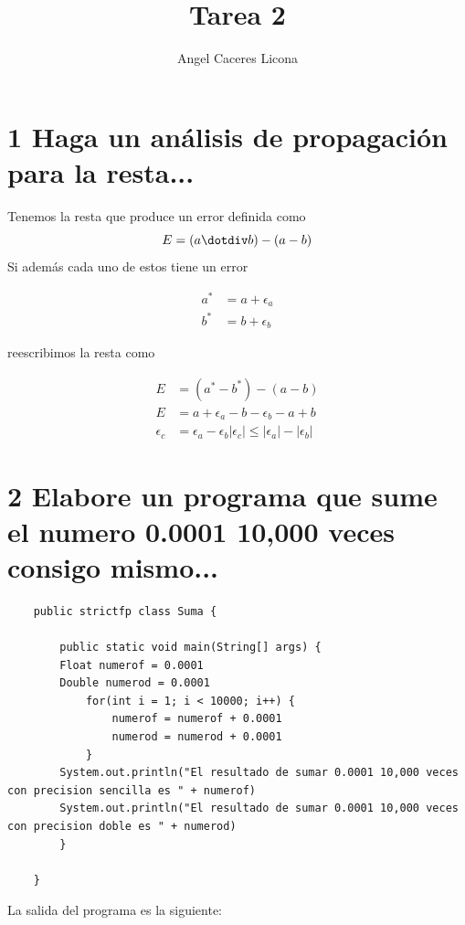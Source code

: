 \documentclass{article}
\begin{document}
\title{Tarea 2}
\author{Angel Caceres Licona}

\maketitle


\section{1 Haga un análisis de propagación para la resta...}
Tenemos la resta que produce un error definida como 
\begin{equation}
    E= (a \dotdiv b) - (a-b)
\end{equation}
Si además cada uno de estos tiene un error 

\begin{equation}
    \begin{aligned}   
    a^* & = a + \epsilon_a\\
    b^* & = b + \epsilon_b
    \end{aligned}   
\end{equation}

reescribimos la resta como

\begin{equation}
    \begin{aligned} 
    E & = (a^* - b^*) - (a-b)\\
    E & = a + \epsilon_a - b - \epsilon_b - a + b \\
    \epsilon_c &= \epsilon_a -  \epsilon_b
    |\epsilon_c| \leq |\epsilon_a| -  |\epsilon_b|
\end{aligned}   
\end{equation}

\section{2 Elabore un programa que sume el numero 0.0001 10,000 veces consigo mismo...}

\begin{lstlisting}
    public strictfp class Suma {

        public static void main(String[] args) {
        Float numerof = 0.0001
        Double numerod = 0.0001
            for(int i = 1; i < 10000; i++) {
                numerof = numerof + 0.0001
                numerod = numerod + 0.0001
            }
        System.out.println("El resultado de sumar 0.0001 10,000 veces con precision sencilla es " + numerof)
        System.out.println("El resultado de sumar 0.0001 10,000 veces con precision doble es " + numerod)
        }    
            
    }
\end{lstlisting}
La salida del programa es la siguiente: 
\end{document}
